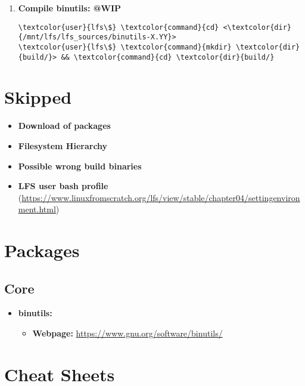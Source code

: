 \documentclass[10pt, a4paper, onecolumn, oneside, titlepage, openany]{book}
\begin{document}
\begin{enumerate}
\begin{Verbatim}[commandchars=\\\{\}]
\textcolor{user}{lfs\$} \textcolor{command}{cd} \textcolor{dir}{/mnt/lfs/lfs_sources/}
\textcolor{user}{lfs\$} \textcolor{command}{tar} xvJf <\textcolor{file}{binutils-X.YY.tar.xz}>
\textcolor{user}{lfs\$} \textcolor{command}{rm} <\textcolor{file}{binutils-X.YY.tar.xz}>
\end{Verbatim}
    \item \textbf{Compile binutils: @WIP}
\begin{Verbatim}[commandchars=\\\{\}]
\textcolor{user}{lfs\$} \textcolor{command}{cd} <\textcolor{dir}{/mnt/lfs/lfs_sources/binutils-X.YY}>
\textcolor{user}{lfs\$} \textcolor{command}{mkdir} \textcolor{dir}{build/}> && \textcolor{command}{cd} \textcolor{dir}{build/}
\end{Verbatim}
\end{enumerate}





\chapter{Skipped}
\begin{itemize}
    \item \textbf{Download of packages}
    \item \textbf{Filesystem Hierarchy}
    \item \textbf{Possible wrong build binaries}
    \item \textbf{LFS user bash profile} (\url{https://www.linuxfromscratch.org/lfs/view/stable/chapter04/settingenvironment.html})
\end{itemize}


\chapter{Packages}
\section{Core}
\begin{itemize}
    \item \textbf{binutils:}
    \begin{itemize}
        \item \textbf{Webpage:} \url{https://www.gnu.org/software/binutils/}
    \end{itemize}
\end{itemize}


\chapter{Cheat Sheets}
\end{document}
